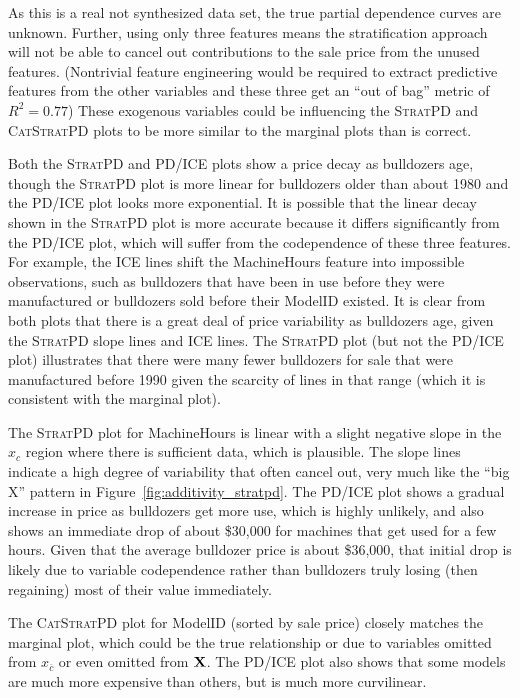 \documentclass[12pt]{article}
\newcommand{\figref}[1]{Figure~\ref{#1}}
\newcommand{\spd}{\fontfamily{cmr}\textsc{\small StratPD}}
\newcommand{\cspd}{\fontfamily{cmr}\textsc{\small CatStratPD}}
\newcommand{\xnc}{$x_{\overline{c}}$}
\begin{document}
As this is a real not synthesized data set, the true partial dependence curves are unknown. Further, using only three features means the stratification approach will not be able to cancel out contributions to the sale price from the unused features. (Nontrivial feature engineering would be required to extract predictive features from the other variables and these three get an ``out of bag'' metric of $R^2=0.77$) These exogenous variables could be influencing the \spd{} and \cspd{} plots to be more similar to the marginal plots than is correct.

Both the \spd{} and PD/ICE plots show a price decay as bulldozers age, though the \spd{} plot is more linear for bulldozers older than about 1980 and the PD/ICE plot looks more exponential. It is possible that the linear decay shown in the \spd{} plot is more accurate because it differs significantly from the PD/ICE plot, which will suffer from the codependence of these three features. For example, the ICE lines shift the MachineHours feature into impossible observations, such as bulldozers that have been in use before they were manufactured or bulldozers sold before their ModelID existed. It is clear from both plots that there is a great deal of price variability as bulldozers age, given the \spd{} slope lines and ICE lines.  The \spd{} plot (but not the PD/ICE plot) illustrates that there were many fewer bulldozers for sale that were manufactured before 1990 given the scarcity of lines in that range (which it is consistent with the marginal plot).

The \spd{} plot for MachineHours is linear with a slight negative slope in the $x_c$ region where there is sufficient data, which is plausible.  The slope lines indicate a high degree of variability that often cancel out, very much like the ``big X'' pattern in \figref{fig:additivity_stratpd}. The PD/ICE plot shows a gradual increase in price as bulldozers get more use, which is highly unlikely, and also shows an immediate drop of about \$30,000 for machines that get used for a few hours. Given that the average bulldozer price is about \$36,000, that initial drop is likely due to variable codependence rather than bulldozers truly losing (then regaining) most of their value immediately.

The \cspd{} plot for ModelID (sorted by sale price) closely matches the marginal plot, which could be the true relationship or due to variables omitted from \xnc{} or even omitted from $\bf X$. The PD/ICE plot also shows that some models are much more expensive than others, but is much more curvilinear.
\end{document}
